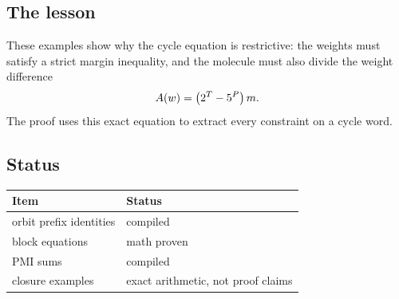 \subsection{The lesson}

These examples show why the cycle equation is restrictive: the
weights must satisfy a strict margin inequality, and the molecule
must also divide the weight difference
\begin{equation*}
  A(w)=\left(2^T-5^P\right)m.
\end{equation*}
The proof uses this exact equation to extract every constraint on a
cycle word.

\subsection{Status}

\begin{center}
\small
\begin{tabular}{@{}p{}p{}@{}}
\toprule
Item & Status \\
\midrule
orbit prefix identities & compiled \\
block equations & math proven \\
PMI sums & compiled \\
closure examples & exact arithmetic, not proof claims \\
\bottomrule
\end{tabular}
\end{center}
